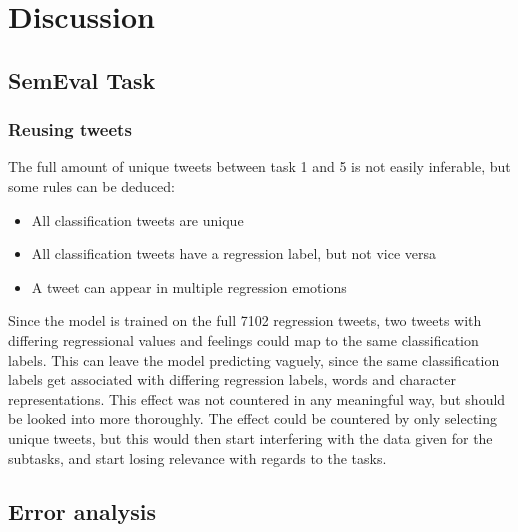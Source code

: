 
\section{Discussion}

\subsection{SemEval Task}
\subsubsection{Reusing tweets} \label{sec:tweetreuse}
The full amount of unique tweets between task 1 and 5 is not easily inferable, but some rules can be deduced:\\
\begin{itemize}
\item All classification tweets are unique
\item All classification tweets have a regression label, but not vice versa
\item A tweet can appear in multiple regression emotions
\end{itemize}
Since the model is trained on the full 7102 regression tweets, two tweets with differing regressional values and feelings could map to the same classification labels. This can leave the model predicting vaguely, since the same classification labels get associated with differing regression labels, words and character representations. This effect was not countered in any meaningful way, but should be looked into more thoroughly. The effect could be countered by only selecting unique tweets, but this would then start interfering with the data given for the subtasks, and start losing relevance with regards to the tasks. 

\subsection{Error analysis} 
